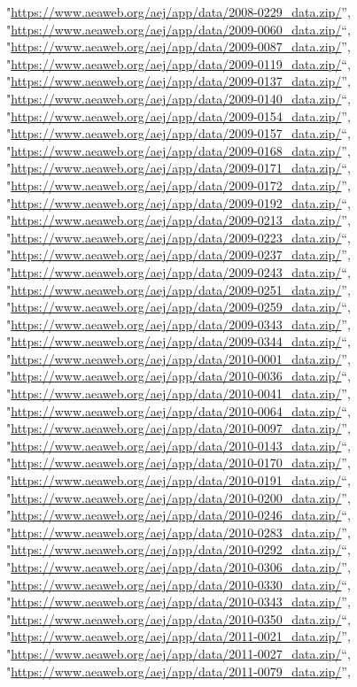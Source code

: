 \documentclass[]{article}
\begin{document}
\begin{itemize}
  "\url{https://www.aeaweb.org/aej/app/data/2008-0229_data.zip/}'',
  "\url{https://www.aeaweb.org/aej/app/data/2009-0060_data.zip/}``,
  "\url{https://www.aeaweb.org/aej/app/data/2009-0087_data.zip/}'',
  "\url{https://www.aeaweb.org/aej/app/data/2009-0119_data.zip/}``,
  "\url{https://www.aeaweb.org/aej/app/data/2009-0137_data.zip/}'',
  "\url{https://www.aeaweb.org/aej/app/data/2009-0140_data.zip/}``,
  "\url{https://www.aeaweb.org/aej/app/data/2009-0154_data.zip/}'',
  "\url{https://www.aeaweb.org/aej/app/data/2009-0157_data.zip/}``,
  "\url{https://www.aeaweb.org/aej/app/data/2009-0168_data.zip/}'',
  "\url{https://www.aeaweb.org/aej/app/data/2009-0171_data.zip/}``,
  "\url{https://www.aeaweb.org/aej/app/data/2009-0172_data.zip/}'',
  "\url{https://www.aeaweb.org/aej/app/data/2009-0192_data.zip/}``,
  "\url{https://www.aeaweb.org/aej/app/data/2009-0213_data.zip/}'',
  "\url{https://www.aeaweb.org/aej/app/data/2009-0223_data.zip/}``,
  "\url{https://www.aeaweb.org/aej/app/data/2009-0237_data.zip/}'',
  "\url{https://www.aeaweb.org/aej/app/data/2009-0243_data.zip/}``,
  "\url{https://www.aeaweb.org/aej/app/data/2009-0251_data.zip/}'',
  "\url{https://www.aeaweb.org/aej/app/data/2009-0259_data.zip/}``,
  "\url{https://www.aeaweb.org/aej/app/data/2009-0343_data.zip/}'',
  "\url{https://www.aeaweb.org/aej/app/data/2009-0344_data.zip/}``,
  "\url{https://www.aeaweb.org/aej/app/data/2010-0001_data.zip/}'',
  "\url{https://www.aeaweb.org/aej/app/data/2010-0036_data.zip/}``,
  "\url{https://www.aeaweb.org/aej/app/data/2010-0041_data.zip/}'',
  "\url{https://www.aeaweb.org/aej/app/data/2010-0064_data.zip/}``,
  "\url{https://www.aeaweb.org/aej/app/data/2010-0097_data.zip/}'',
  "\url{https://www.aeaweb.org/aej/app/data/2010-0143_data.zip/}``,
  "\url{https://www.aeaweb.org/aej/app/data/2010-0170_data.zip/}'',
  "\url{https://www.aeaweb.org/aej/app/data/2010-0191_data.zip/}``,
  "\url{https://www.aeaweb.org/aej/app/data/2010-0200_data.zip/}'',
  "\url{https://www.aeaweb.org/aej/app/data/2010-0246_data.zip/}``,
  "\url{https://www.aeaweb.org/aej/app/data/2010-0283_data.zip/}'',
  "\url{https://www.aeaweb.org/aej/app/data/2010-0292_data.zip/}``,
  "\url{https://www.aeaweb.org/aej/app/data/2010-0306_data.zip/}'',
  "\url{https://www.aeaweb.org/aej/app/data/2010-0330_data.zip/}``,
  "\url{https://www.aeaweb.org/aej/app/data/2010-0343_data.zip/}'',
  "\url{https://www.aeaweb.org/aej/app/data/2010-0350_data.zip/}``,
  "\url{https://www.aeaweb.org/aej/app/data/2011-0021_data.zip/}'',
  "\url{https://www.aeaweb.org/aej/app/data/2011-0027_data.zip/}``,
  "\url{https://www.aeaweb.org/aej/app/data/2011-0079_data.zip/}'',

\end{itemize}
\end{document}
